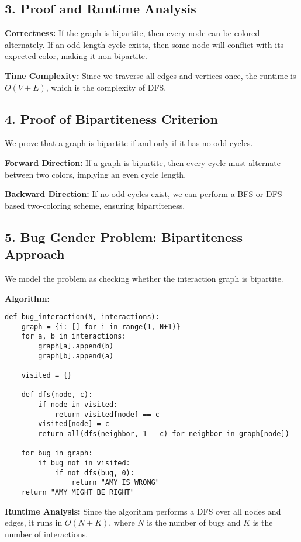 \documentclass[12pt]{article}
\begin{document}
\subsection*{3. Proof and Runtime Analysis}
\textbf{Correctness:}
If the graph is bipartite, then every node can be colored alternately. If an odd-length cycle exists, then some node will conflict with its expected color, making it non-bipartite.

\textbf{Time Complexity:}
Since we traverse all edges and vertices once, the runtime is \(O(V + E)\), which is the complexity of DFS.

\subsection*{4. Proof of Bipartiteness Criterion}
We prove that a graph is bipartite if and only if it has no odd cycles.

\textbf{Forward Direction:} If a graph is bipartite, then every cycle must alternate between two colors, implying an even cycle length.

\textbf{Backward Direction:} If no odd cycles exist, we can perform a BFS or DFS-based two-coloring scheme, ensuring bipartiteness.

\subsection*{5. Bug Gender Problem: Bipartiteness Approach}

We model the problem as checking whether the interaction graph is bipartite.

\textbf{Algorithm:}
\begin{lstlisting}
def bug_interaction(N, interactions):
    graph = {i: [] for i in range(1, N+1)}
    for a, b in interactions:
        graph[a].append(b)
        graph[b].append(a)
    
    visited = {}
    
    def dfs(node, c):
        if node in visited:
            return visited[node] == c
        visited[node] = c
        return all(dfs(neighbor, 1 - c) for neighbor in graph[node])
    
    for bug in graph:
        if bug not in visited:
            if not dfs(bug, 0):
                return "AMY IS WRONG"
    return "AMY MIGHT BE RIGHT"
\end{lstlisting}

\textbf{Runtime Analysis:} Since the algorithm performs a DFS over all nodes and edges, it runs in \(O(N + K)\), where \(N\) is the number of bugs and \(K\) is the number of interactions.
\end{document}
